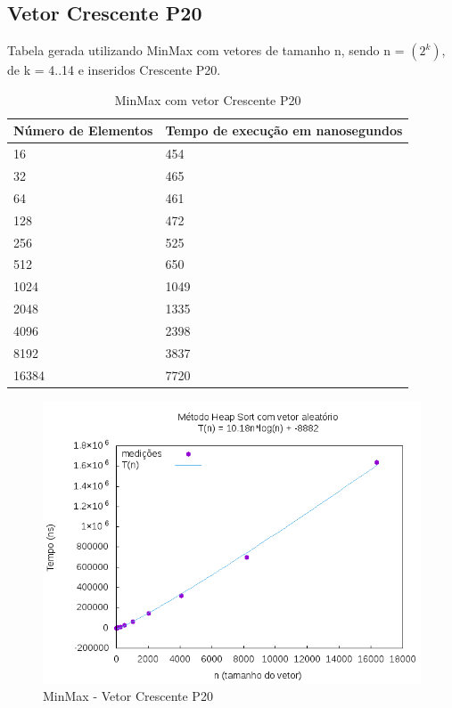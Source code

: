 \documentclass[12pt,a4paper,twoside]{report}
\begin{document}
\subsection{Vetor Crescente P20}
Tabela gerada utilizando MinMax com vetores de tamanho n, sendo n = $(2^k)$, de k = 4..14 e inseridos Crescente P20.
\begin{table}[H]
\centering
\caption{MinMax com vetor Crescente P20}
\label{my-label}
\begin{tabular}{|l|l|}
\hline
\multicolumn{1}{|c|}{\textbf{Número de Elementos}} & \multicolumn{1}{c|}{\textbf{Tempo de execução em nanosegundos}} \\ \hline
16 & 454 \\ \hline
32 & 465 \\ \hline
64 & 461 \\ \hline
128 & 472 \\ \hline
256 & 525 \\ \hline
512 & 650 \\ \hline
1024 & 1049 \\ \hline
2048 & 1335 \\ \hline
4096 & 2398 \\ \hline
8192 & 3837 \\ \hline
16384 & 7720 \\ \hline
\end{tabular}
\end{table}

\begin{figure}[H]
    \centering
    \includegraphics[width=0.7\linewidth]{graficos/HeapSort/vIntAleatorio/vIntAleatorio.png}
  \caption{MinMax - Vetor Crescente P20}
\end{figure}
\end{document}
